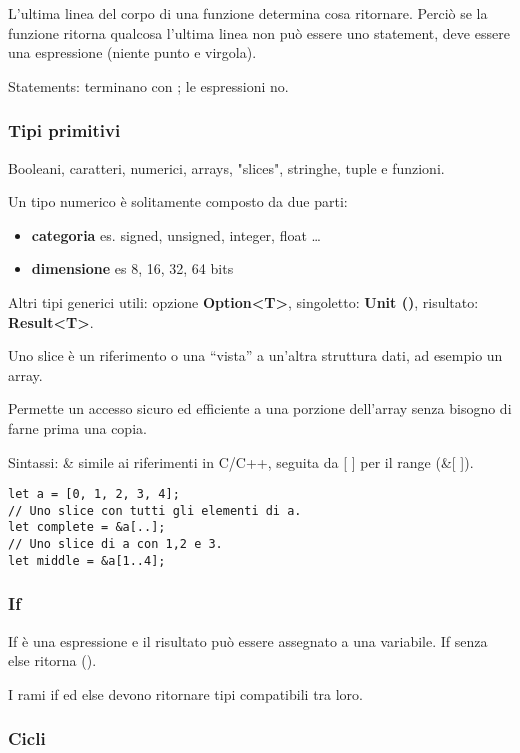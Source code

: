 L'ultima linea del corpo di una funzione determina cosa ritornare.
Perciò se la funzione ritorna qualcosa l'ultima linea non può essere uno
statement, deve essere una espressione (niente punto e virgola).

Statements: terminano con ; le espressioni no.

\subsubsection{Tipi primitivi}

Booleani, caratteri, numerici, arrays, "slices", stringhe, tuple e funzioni.

Un tipo numerico è solitamente composto da due parti:

\begin{itemize}
\item \textbf{categoria} es. signed, unsigned, integer, float \dots
\item \textbf{dimensione} es 8, 16, 32, 64 bits
\end{itemize}

Altri tipi generici utili: opzione \textbf{Option<T>}, singoletto:
\textbf{Unit ()}, risultato: \textbf{Result<T>}.

Uno slice è un riferimento o una ``vista'' a un'altra struttura dati, ad esempio
un array.

Permette un accesso sicuro ed efficiente a una porzione dell'array senza bisogno
di farne prima una copia.

Sintassi: \& simile ai riferimenti in C/C++, seguita da [ ] per il range (\&[ ]).

\begin{lstlisting}
let a = [0, 1, 2, 3, 4];
// Uno slice con tutti gli elementi di a.
let complete = &a[..];
// Uno slice di a con 1,2 e 3.
let middle = &a[1..4];
\end{lstlisting}

\subsubsection{If}
If è una espressione e il risultato può essere assegnato a una variabile.
If senza else ritorna ().

I rami if ed else devono ritornare tipi compatibili tra loro.

\subsubsection{Cicli}

